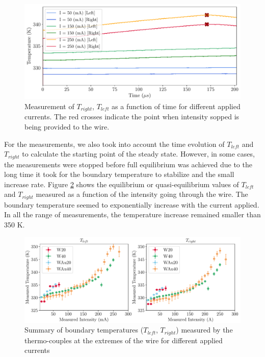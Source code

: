 \begin{figure}[h]
    \centering
    \includegraphics[width=0.8\columnwidth]{Figure_TrightTleft/TleftTright_time.pdf}
    \caption{Measurement of $T_{right}$, $T_{left}$ as a function of time for different applied currents. The red crosses indicate the point when intensity sopped is being provided to the wire.}
    \label{fig:ExtremeTempMeas}
\end{figure}

For the measurements, we also took into account the time evolution of $T_{left}$ and $T_{right}$ to calculate the starting point of the steady state. However, in some cases, the measurements were stopped before full equilibrium was achieved due to the long time it took for the boundary temperature to stabilize and the small increase rate. Figure \ref{fig:summaryTleftTright} shows the equilibrium or quasi-equilibrium values of $T_{left}$ and $T_{right}$ measured as a function of the intensity going through the wire. The boundary temperature seemed to exponentially increase with the current applied. In all the range of measurements, the temperature increase remained smaller than 350 K.

\begin{figure}[h]
    \centering
    \includegraphics[width=1.0\columnwidth]{Figure_TrightTleft/TleftTright.pdf}
    \caption{Summary of boundary temperatures ($T_{left}$, $T_{right}$) measured by the thermo-couples at the extremes of the wire for different applied currents}
    \label{fig:summaryTleftTright}
\end{figure}

